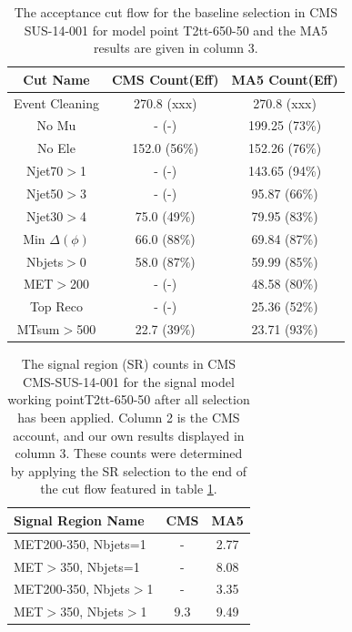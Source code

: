 \begin{table}
    \begin{centering}
    \begin{tabular}{  c | c | c  }
    \hline
        \hline
    Cut Name & CMS Count(Eff) & MA5 Count(Eff)\\
    \hline
        Event Cleaning & 270.8 (xxx) & 270.8 (xxx)\\
    No Mu & - (-) & 199.25 (73\%)\\
    No Ele & 152.0 (56\%) & 152.26 (76\%)\\
    Njet70$>$1 & - (-) & 143.65 (94\%)\\
    Njet50$>$3 & - (-) & 95.87 (66\%)\\
    Njet30$>$4 & 75.0 (49\%) & 79.95 (83\%)\\
    Min $\Delta(\phi)$ & 66.0 (88\%) & 69.84 (87\%)\\
    Nbjets$>$0 & 58.0 (87\%) & 59.99 (85\%)\\
    MET$>$200 & - (-) & 48.58 (80\%)\\
    Top Reco & - (-) & 25.36 (52\%)\\
    MTsum$>$500 & 22.7 (39\%) & 23.71 (93\%)\\
\hline
    \end{tabular}
    \caption{The acceptance cut flow for the baseline selection in CMS SUS-14-001 for
    model point T2tt-650-50 and the MA5 results are given in column 3.}
    \label{table:T2tt-650-50}
    \end{centering}
    \end{table}

    \begin{table}
    \begin{centering}
    \begin{tabular}{  l | c | c  }
    \hline
    Signal Region Name & CMS & MA5\\
    \hline
    MET200-350,  Nbjets=1 & - & 2.77\\ 
 \hline 
MET$>$350,  Nbjets=1 & - & 8.08\\ 
 \hline 
MET200-350,  Nbjets$>$1 & - & 3.35\\ 
 \hline 
MET$>$350,  Nbjets$>$1 & 9.3 & 9.49\\ 
 \hline 
\hline
    \end{tabular}
    \caption{The signal region (SR) counts in CMS CMS-SUS-14-001 for
    the signal model working pointT2tt-650-50 after all selection has been applied. Column 2 is the CMS account,
    and our own results displayed in column 3. These counts were determined by applying the SR selection to the end of the cut flow featured in table \ref{table:T2tt-650-50}.}
    \end{centering}
    \end{table}


